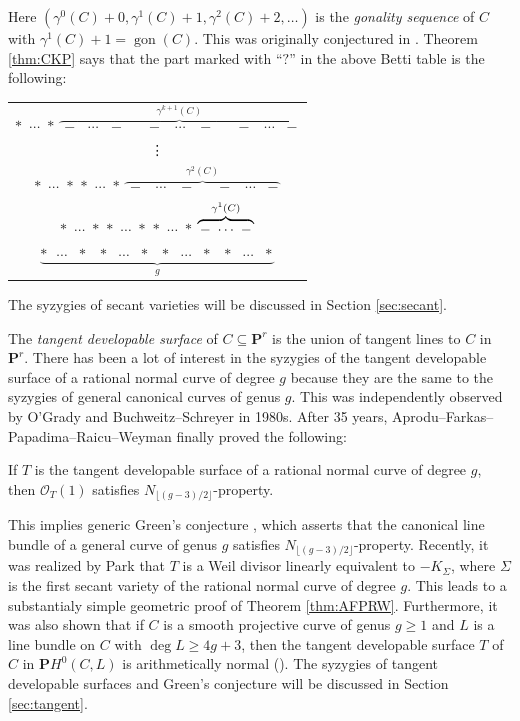 \documentclass[graybox]{svmult}
\newcommand{\kk}{\mathbf{k}}
\newcommand{\sO}{\mathscr{O}}
\def\nP{\mathbf{P}}
\DeclareMathOperator{\gon}{gon}
\begin{document}
\noindent Here $(\gamma^0(C)+0, \gamma^1(C)+1, \gamma^2(C)+2, \ldots)$ is the \emph{gonality sequence} of $C$ with $\gamma^1(C)+1=\gon(C)$. This was originally conjectured in \cite{CK}. Theorem \ref{thm:CKP} says that the part marked with ``$?$'' in the above Betti table is the following:
\begin{center}
\begin{tabular}{c}
 \texttt{$*$ $\cdots$ $*$} $\overbrace{\text{$\, -$ $\cdots$ $-$ } \, \text{ $-$ $\, \cdots \, $ $-$ } \, \text{ $-$ $\, \cdots \,$ $-\,$}}^{\gamma^{k+1}(C)}$\\
\vdots\\
 \texttt{$*$ $\cdots$ $*$ $*$ $\cdots$ $*$}  $\overbrace{\text{$\, -$ $\, \cdots\, $ $-$ } \, \text{ $-$ $\, \cdots \,$ $-\,$}}^{\gamma^2(C)}$\\
 \texttt{$*$ $\cdots$ $*$ $*$ $\cdots$ $*$ $*$ $\cdots$ $*$} $\overbrace{\text{$\,-$ $ \, \cdots \,$ $-\,$}}^{\gamma^1(C)}$\\
$\underbrace{\texttt{$*$ $\cdots$ $*$ $*$ $\cdots$ $*$ $*$ $\cdots$ $*$ $*$ $\cdots$ $*$}}_{g}$\\
\end{tabular}
\end{center}
The syzygies of secant varieties will be discussed in Section \ref{sec:secant}.

The \emph{tangent developable surface} of $C \subseteq \nP^r$ is the union of tangent lines to $C$ in $\nP^r$. There has been a lot of interest in the syzygies of the tangent developable surface of a rational normal curve of degree $g$ because they are the same to the syzygies of general canonical curves of genus $g$. This was independently observed by O’Grady and Buchweitz–Schreyer in 1980s. After 35 years, Aprodu--Farkas--Papadima--Raicu--Weyman \cite{AFPRW} finally proved the following:

\begin{theorem}[{$\operatorname{char}(\kk) = 0$ \normalfont{or} $\geq (g+2)/2$}]\label{thm:AFPRW}
If $T$ is the tangent developable surface of a rational normal curve of degree $g$, then $\sO_T(1)$ satisfies $N_{\lfloor (g-3)/2 \rfloor}$-property.
\end{theorem}

\noindent This implies generic Green's conjecture \cite[Conjecture 5.6]{Green1}, which asserts that the canonical line bundle of a general curve of genus $g$ satisfies $N_{\lfloor (g-3)/2 \rfloor}$-property. Recently, it was realized by Park  \cite{Park2} that $T$ is a Weil divisor linearly equivalent to $-K_{\Sigma}$, where $\Sigma$ is the first secant variety of the rational normal curve of degree $g$. This leads to a substantialy simple geometric proof of Theorem \ref{thm:AFPRW}. Furthermore, it was also shown that if $C$ is a smooth projective curve of genus $g \geq 1$ and $L$ is a line bundle on $C$ with $\deg L \geq 4g+3$, then the tangent developable surface $T$ of $C$ in $\nP H^0(C, L)$ is arithmetically normal (\cite[Theorem 1.3]{Park2}). The syzygies of tangent developable surfaces and Green's conjecture will be discussed in Section \ref{sec:tangent}.
\end{document}
